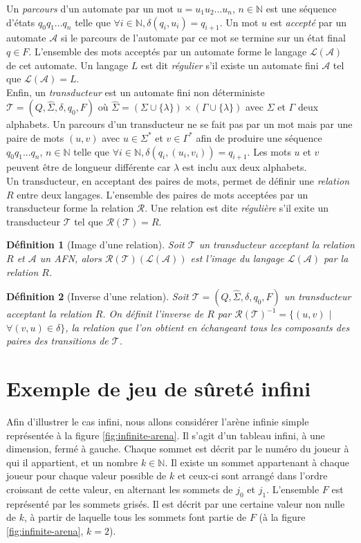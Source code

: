 \documentclass[12pt,a4paper,oneside,titlepage]{report}
\newtheorem{defi}{D\'efinition}[section]
\begin{document}
\noindent Un \emph{parcours} d'un automate par un mot $u=u_1u_2...u_n$, $n\in\mathbb{N}$ est une séquence d'états $q_0q_1...q_n$ telle que $\forall i\in\mathbb{N}, \delta(q_i,u_i)=q_{i+1}$. Un mot $u$ est \emph{accepté} par un automate $\mathcal{A}$ si le parcours de l'automate par ce mot se termine sur un état final $q\in F$. L'ensemble des mots acceptés par un automate forme le langage $\mathcal{L}(\mathcal{A})$ de cet automate. Un langage $L$ est dit \emph{régulier} s'il existe un automate fini $\mathcal{A}$ tel que $\mathcal{L}(\mathcal{A})=L$.\\


\noindent Enfin, un \emph{transducteur} est un automate fini non déterministe $\mathcal{T}=(Q,\hat{\Sigma},\delta,q_0,F)$ où $\hat{\Sigma}=(\Sigma\cup\{\lambda\})\times(\Gamma\cup\{\lambda\})$ avec $\Sigma$ et $\Gamma$ deux alphabets. Un parcours d'un transducteur ne se fait pas par un mot mais par une paire de mots $(u,v)$ avec $u\in\Sigma^*$ et $v\in\Gamma^*$ afin de produire une séquence $q_0q_1...q_n$, $n\in\mathbb{N}$ telle que $\forall i\in\mathbb{N}, \delta(q_i,(u_i,v_i))=q_{i+1}$. Les mots $u$ et $v$ peuvent être de longueur différente car $\lambda$ est inclu aux deux alphabets.\\
Un transducteur, en acceptant des paires de mots, permet de définir une \emph{relation} $R$ entre deux langages. L'ensemble des paires de mots acceptées par un transducteur forme la relation $\mathcal{R}$. Une relation est dite \emph{régulière} s'il exite un transducteur $\mathcal{T}$ tel que $\mathcal{R}(\mathcal{T})=R$.
\begin{defi}[Image d'une relation]
Soit $\mathcal{T}$ un transducteur acceptant la relation $R$ et $\mathcal{A}$ un AFN, alors $\mathcal{R}(\mathcal{T})(\mathcal{L}(\mathcal{A}))$ est l'image du langage $\mathcal{L}(\mathcal{A})$ par la relation $R$.
\end{defi}
\begin{defi}[Inverse d'une relation]
Soit $\mathcal{T}=(Q,\hat{\Sigma},\delta,q_0,F)$ un transducteur acceptant la relation $R$. On définit l'inverse de $R$ par $\mathcal{R}(\mathcal{T})^{-1}=\{(u,v)$ $|$ $\forall (v,u)\in \delta\}$, la relation que l'on obtient en échangeant tous les composants des paires des transitions de $\mathcal{T}$.
\end{defi}

\section{Exemple de jeu de sûreté infini}
Afin d'illustrer le cas infini, nous allons considérer l'arène infinie simple représentée à la figure \ref{fig:infinite-arena}. Il s'agit d'un tableau infini, à une dimension, fermé à gauche. Chaque sommet est décrit par le numéro du joueur à qui il appartient, et un nombre $k\in\mathbb{N}$. Il existe un sommet appartenant à chaque joueur pour chaque valeur possible de $k$ et ceux-ci sont arrangé dans l'ordre croissant de cette valeur, en alternant les sommets de $j_0$ et $j_1$. L'ensemble $F$ est représenté par les sommets grisés. Il est décrit par une certaine valeur non nulle de $k$, à partir de laquelle tous les sommets font partie de $F$ (à la figure \ref{fig:infinite-arena}, $k=2$).
\end{document}
